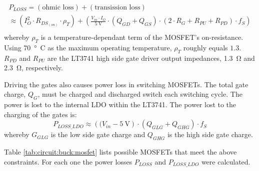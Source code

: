 \begin{multline}
    P_{LOSS} = (\textrm{ohmic loss}) + (\textrm{transission loss}) \\
             \approx \left( I_O^2 \cdot R_{DS_{(on)}} \cdot \rho_T \right)
                    + \left( \frac{V_{in} \cdot I_O}{\SI{5}{\volt}} \cdot \left(Q_{GD} + Q_{GS} \right) \cdot \left( 2 \cdot R_G + R_{PU} + R_{PD} \right) \cdot f_S \right) \\
    \label{eq:circuit:buck:mosfet_ploss}
\end{multline}
whereby   $\rho_T$   is  a   temperature-dependant   term   of  the   MOSFET's
on-resistance.  Using \SI{70}{\degree C} as the maximum operating temperature,
$\rho_T$  roughly equals  $1.3$.  $R_{PD}$  and $R_{PU}$  are the  LT3741 high
side  gate  driver  output   impedances,  \SI{1.3}{\ohm}  and  \SI{2.3}{\ohm},
respectively.

Driving the gates also causes power loss in switching MOSFETs.  The total gate
charge, $Q_G$, must be charged and discharged switch each switching cycle. The
power is  lost to the internal  LDO within the  LT3741. The power lost  to the
charging of the gates is:
\begin{equation}
    P_{LOSS\_LDO} \approx \left( (V_{in} - \SI{5}{\volt} \right) \cdot \left( Q_{GLG} + Q_{GHG} \right) \cdot f_S
    \label{eq:circuit:buck:switching_loss}
\end{equation}
whereby $G_{GLG}$ is the  low side gate charge and $Q_{GHG}$  is the high side
gate charge.

Table \ref{tab:circuit:buck:mosfet} lists possible MOSFETs that meet the above
constraints.  For  each one  the power  losses $P_{LOSS}$  and $P_{LOSS\_LDO}$
were calculated.

